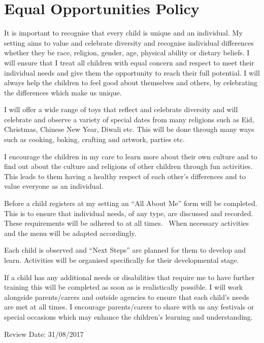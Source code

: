 

\section{Equal Opportunities Policy}

It is important to recognise that every child is unique and an
individual. My setting aims to value and celebrate diversity and
recognise individual differences whether they be race, religion, gender,
age, physical ability or dietary beliefs. I will ensure that I treat all
children with equal concern and respect to meet their individual needs
and give them the opportunity to reach their full potential. I will
always help the children to feel good about themselves and others, by
celebrating the differences which make us unique.

I will offer a wide range of toys that reflect and celebrate diversity
and will celebrate and observe a variety of special dates from many
religions such as Eid, Christmas, Chinese New Year, Diwali etc. This
will be done through many ways such as cooking, baking, crafting and
artwork, parties etc.

I encourage the children in my care to learn more about their own
culture and to find out about the culture and religions of other
children through fun activities. This leads to them having a healthy
respect of each other's differences and to value everyone as an
individual.

Before a child registers at my setting an ``All About Me'' form will be
completed. This is to ensure that individual needs, of any type, are
discussed and recorded. These requirements will be adhered to at all
times. ~When necessary activities and the menu will be adapted
accordingly.

Each child is observed and ``Next Steps'' are planned for them to
develop and learn. Activities will be organised specifically for their
developmental stage.

If a child has any additional needs or disabilities that require me to
have further training this will be completed as soon as is realistically
possible. I will work alongside parents/carers and outside agencies to
ensure that each child's needs are met at all times. I encourage
parents/carers to share with us any festivals or special occasions which
may enhance the children's learning and understanding.

Review Date: 31/08/2017



